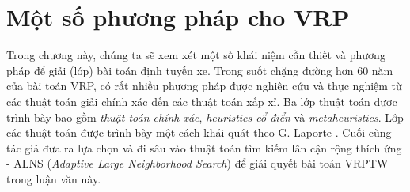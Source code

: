 \chapter{Một số phương pháp cho VRP}
\label{chap:solution}

Trong chương này, chúng ta sẽ xem xét một số khái niệm cần thiết và phương pháp để giải (lớp) bài toán định tuyến xe. Trong suốt chặng đường hơn 60 năm của bài toán VRP, có rất nhiều phương pháp được nghiên cứu và thực nghiệm từ các thuật toán giải chính xác đến các thuật toán xấp xỉ. Ba lớp thuật toán được trình bày bao gồm \textit{thuật toán chính xác}, \textit{heuristics cổ điển} và \textit{metaheuristics}. Lớp các thuật toán được trình bày một cách khái quát theo G. Laporte \cite{laporte2009fifty}. Cuối cùng tác giả đưa ra lựa chọn và đi sâu vào thuật toán tìm kiếm lân cận rộng thích ứng - ALNS (\textit{Adaptive Large Neighborhood Search}) để giải quyết bài toán VRPTW trong luận văn này.

